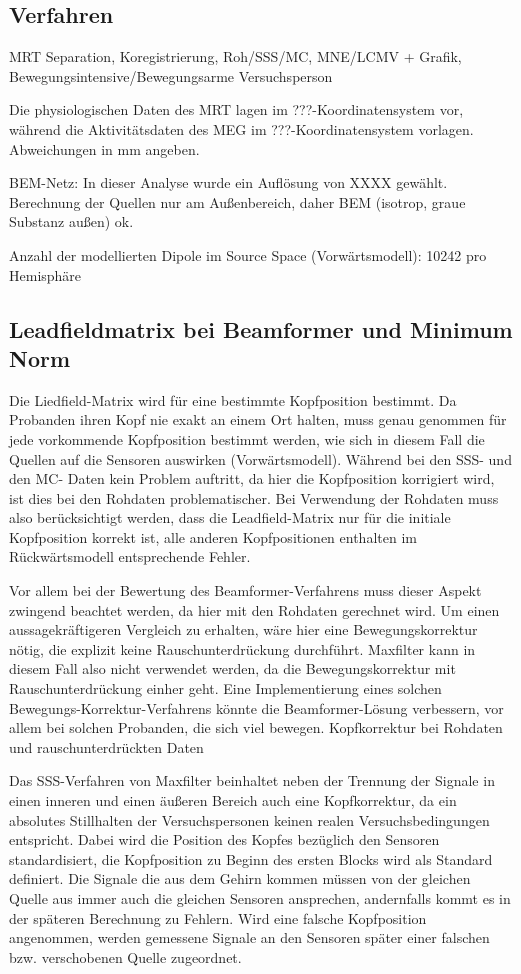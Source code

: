 \documentclass[doc,a4paper,12pt]{apa6}
\begin{document}

\subsection{Verfahren}

MRT Separation, Koregistrierung, Roh/SSS/MC, MNE/LCMV + Grafik, Bewegungsintensive/Bewegungsarme Versuchsperson

Die physiologischen Daten des MRT lagen im ???-Koordinatensystem vor, während die Aktivitätsdaten des MEG im ???-Koordinatensystem vorlagen. Abweichungen in mm angeben.

BEM-Netz: In dieser Analyse wurde ein Auflösung von XXXX gewählt.
Berechnung der Quellen nur am Außenbereich, daher BEM (isotrop, graue Substanz außen) ok.

Anzahl der modellierten Dipole im Source Space (Vorwärtsmodell): 10242 pro Hemisphäre

\subsection{Leadfieldmatrix bei Beamformer und Minimum Norm}

Die Liedfield-Matrix wird für eine bestimmte Kopfposition bestimmt. Da Probanden ihren Kopf nie exakt an einem Ort halten, muss genau genommen für jede vorkommende Kopfposition bestimmt werden, wie sich in diesem Fall die Quellen auf die Sensoren auswirken (Vorwärtsmodell). Während bei den SSS- und den MC- Daten kein Problem auftritt, da hier die Kopfposition korrigiert wird, ist dies bei den Rohdaten problematischer. Bei Verwendung der Rohdaten muss also berücksichtigt werden, dass die Leadfield-Matrix nur für die initiale Kopfposition korrekt ist, alle anderen Kopfpositionen enthalten im Rückwärtsmodell entsprechende Fehler.

Vor allem bei der Bewertung des Beamformer-Verfahrens muss dieser Aspekt zwingend beachtet werden, da hier mit den Rohdaten gerechnet wird. Um einen aussagekräftigeren Vergleich zu erhalten, wäre hier eine Bewegungskorrektur nötig, die explizit keine Rauschunterdrückung durchführt. Maxfilter kann in diesem Fall also nicht verwendet werden, da die Bewegungskorrektur mit Rauschunterdrückung einher geht. Eine Implementierung eines solchen Bewegungs-Korrektur-Verfahrens könnte die Beamformer-Lösung verbessern, vor allem bei solchen Probanden, die sich viel bewegen.
Kopfkorrektur bei Rohdaten und rauschunterdrückten Daten

Das SSS-Verfahren von Maxfilter beinhaltet neben der Trennung der Signale in einen inneren und einen äußeren Bereich auch eine Kopfkorrektur, da ein absolutes Stillhalten der Versuchspersonen keinen realen Versuchsbedingungen entspricht. Dabei wird die Position des Kopfes bezüglich den Sensoren standardisiert, die Kopfposition zu Beginn des ersten Blocks wird als Standard definiert. Die Signale die aus dem Gehirn kommen müssen von der gleichen Quelle aus immer auch die gleichen Sensoren ansprechen, andernfalls kommt es in der späteren Berechnung zu Fehlern. Wird eine falsche Kopfposition angenommen, werden gemessene Signale an den Sensoren später einer falschen bzw. verschobenen Quelle zugeordnet.
\end{document}
